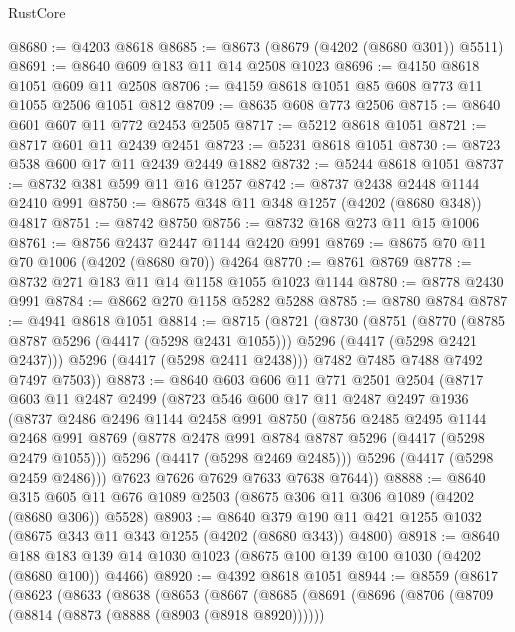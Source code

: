 \begin{lexlean}{RustCore}
\begin{coremodule}
@8680 := @4203 @8618
@8685 := @8673 (@8679 (@4202 (@8680 @301)) @5511)
@8691 := @8640 @609 @183 @11 @14 @2508 @1023
@8696 := @4150 @8618 @1051 @609 @11 @2508
@8706 := @4159 @8618 @1051 @85 @608 @773 @11 @1055 @2506 @1051 @812
@8709 := @8635 @608 @773 @2506
@8715 := @8640 @601 @607 @11 @772 @2453 @2505
@8717 := @5212 @8618 @1051
@8721 := @8717 @601 @11 @2439 @2451
@8723 := @5231 @8618 @1051
@8730 := @8723 @538 @600 @17 @11 @2439 @2449 @1882
@8732 := @5244 @8618 @1051
@8737 := @8732 @381 @599 @11 @16 @1257
@8742 := @8737 @2438 @2448 @1144 @2410 @991
@8750 := @8675 @348 @11 @348 @1257 (@4202 (@8680 @348)) @4817
@8751 := @8742 @8750
@8756 := @8732 @168 @273 @11 @15 @1006
@8761 := @8756 @2437 @2447 @1144 @2420 @991
@8769 := @8675 @70 @11 @70 @1006 (@4202 (@8680 @70)) @4264
@8770 := @8761 @8769
@8778 := @8732 @271 @183 @11 @14 @1158 @1055 @1023 @1144
@8780 := @8778 @2430 @991
@8784 := @8662 @270 @1158 @5282 @5288
@8785 := @8780 @8784
@8787 := @4941 @8618 @1051
@8814 := @8715
    (@8721
      (@8730
        (@8751
          (@8770 (@8785 @8787 @5296 (@4417 (@5298 @2431 @1055))) @5296 (@4417 (@5298 @2421 @2437)))
          @5296
          (@4417 (@5298 @2411 @2438)))
        @7482
        @7485
        @7488
        @7492
        @7497
        @7503))
@8873 := @8640
    @603
    @606
    @11
    @771
    @2501
    @2504
    (@8717
      @603
      @11
      @2487
      @2499
      (@8723
        @546
        @600
        @17
        @11
        @2487
        @2497
        @1936
        (@8737
          @2486
          @2496
          @1144
          @2458
          @991
          @8750
          (@8756
            @2485
            @2495
            @1144
            @2468
            @991
            @8769
            (@8778 @2478 @991 @8784 @8787 @5296 (@4417 (@5298 @2479 @1055)))
            @5296
            (@4417 (@5298 @2469 @2485)))
          @5296
          (@4417 (@5298 @2459 @2486)))
        @7623
        @7626
        @7629
        @7633
        @7638
        @7644))
@8888 := @8640 @315 @605 @11 @676 @1089 @2503 (@8675 @306 @11 @306 @1089 (@4202 (@8680 @306)) @5528)
@8903 := @8640 @379 @190 @11 @421 @1255 @1032 (@8675 @343 @11 @343 @1255 (@4202 (@8680 @343)) @4800)
@8918 := @8640
    @188
    @183
    @139
    @14
    @1030
    @1023
    (@8675 @100 @139 @100 @1030 (@4202 (@8680 @100)) @4466)
@8920 := @4392 @8618 @1051
@8944 := @8559
    (@8617
      (@8623
        (@8633
          (@8638
            (@8653
              (@8667
                (@8685
                  (@8691
                    (@8696
                      (@8706
                        (@8709 (@8814 (@8873 (@8888 (@8903 (@8918 @8920))))))

\end{coremodule}
\end{lexlean}
